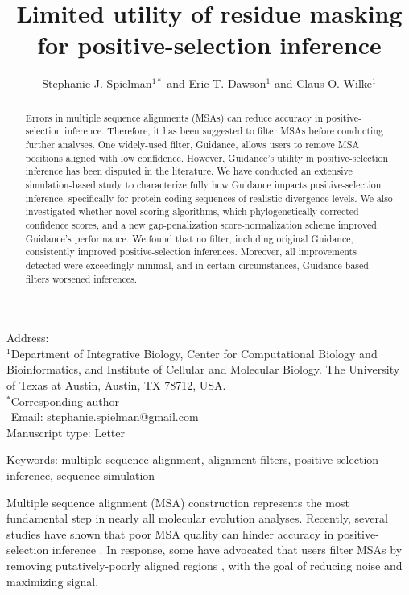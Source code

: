 \documentclass[11pt]{article}
\begin{document}
\title{\textbf{Limited utility of residue masking for positive-selection inference}}
\author{Stephanie J. Spielman$^{1*}$ and Eric T. Dawson$^{1}$ and Claus O. Wilke$^{1}$}
\date{}

\maketitle
\noindent
Address:\\
$^1$Department of Integrative Biology, Center for Computational Biology and Bioinformatics, and Institute of Cellular and Molecular Biology.
The University of Texas at Austin, Austin, TX 78712, USA.\\

\bigskip
\noindent
$^*$Corresponding author\\
$\phantom{^*}$Email: stephanie.spielman@gmail.com\\

\bigskip
\noindent
Manuscript type: Letter

\bigskip
\noindent Keywords: multiple sequence alignment, alignment filters, positive-selection inference, sequence simulation

\newpage
\begin{abstract}
Errors in multiple sequence alignments (MSAs) can reduce accuracy in positive-selection inference. Therefore, it has been suggested to filter MSAs before conducting further analyses. One widely-used filter, Guidance, allows users to remove MSA positions aligned with low confidence. However, Guidance's utility in positive-selection inference has been disputed in the literature. We have conducted an extensive simulation-based study to characterize fully how Guidance impacts positive-selection inference, specifically for protein-coding sequences of realistic divergence levels. We also investigated whether novel scoring algorithms, which phylogenetically corrected confidence scores, and a new gap-penalization score-normalization scheme improved Guidance's performance. We found that no filter, including original Guidance, consistently improved positive-selection inferences. Moreover, all improvements detected were exceedingly minimal, and in certain circumstances, Guidance-based filters worsened inferences.
\end{abstract}

Multiple sequence alignment (MSA) construction represents the most fundamental step in nearly all molecular evolution analyses. Recently, several studies have shown that poor MSA quality can hinder accuracy in positive-selection inference \citep{Schneider2009, Fletcher2010, MarkovaRaina2011}. In response, some have advocated that users filter MSAs by removing putatively-poorly aligned regions \citep{Privman2012,Jordan2012}, with the goal of reducing noise and maximizing signal.
\end{document}
